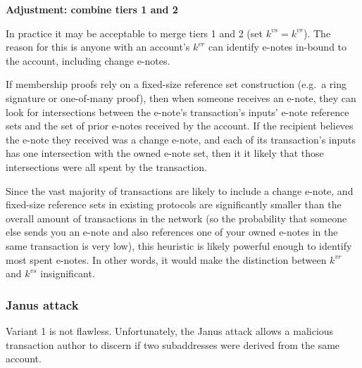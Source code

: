\textbf{Adjustment: combine tiers 1 and 2}

In practice it may be acceptable to merge tiers 1 and 2 (set $k^{vs} = k^{vr}$). The reason for this is anyone with an account's $k^{vr}$ can identify e-notes in-bound to the account, including change e-notes.

If membership proofs rely on a fixed-size reference set construction (e.g.\ a ring signature or one-of-many proof), then when someone receives an e-note, they can look for intersections between the e-note's transaction's inputs' e-note reference sets and the set of prior e-notes received by the account. If the recipient believes the e-note they received was a change e-note, and each of its transaction's inputs has one intersection with the owned e-note set, then it it likely that those intersections were all spent by the transaction.

Since the vast majority of transactions are likely to include a change e-note, and fixed-size reference sets in existing protocols are significantly smaller than the overall amount of transactions in the network (so the probability that someone else sends you an e-note and also references one of your owned e-notes in the same transaction is very low), this heuristic is likely powerful enough to identify most spent e-notes. In other words, it would make the distinction between $k^{vr}$ and $k^{vs}$ insignificant.

\subsubsection{Janus attack}

Variant 1 is not flawless. Unfortunately, the Janus attack \cite{janus-attack} allows a malicious transaction author to discern if two subaddresses were derived from the same account.

